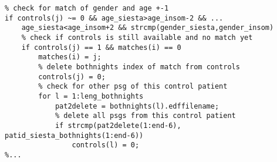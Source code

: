 \lstset{language=Matlab}
\begin{lstlisting}[caption={Statistisches Matching in Skript ma\_statistical\_matching.m}, label={lst:matching}]
% ...
% check for match of gender and age +-1
if controls(j) ~= 0 && age_siesta>age_insom-2 && ...
    age_siesta<age_insom+2 && strcmp(gender_siesta,gender_insom)
    % check if controls is still available and no match yet
    if controls(j) == 1 && matches(i) == 0
        matches(i) = j;
        % delete bothnights index of match from controls
        controls(j) = 0;
        % check for other psg of this control patient
        for l = 1:leng_bothnights
            pat2delete = bothnights(l).edffilename;
            % delete all psgs from this control patient
            if strcmp(pat2delete(1:end-6), patid_siesta_bothnights(1:end-6))
                controls(l) = 0;
%...
\end{lstlisting}



